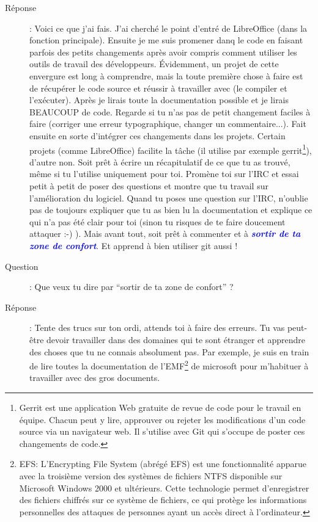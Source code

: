 \documentclass[a4paper,12pt, draft]{report}
\newcommand{\importantPoint}[1]{\textcolor{blue}{\textbf{\textit{#1}}}}
\begin{document}
\begin{description}
\item [Réponse]: Voici ce que j'ai fais. J'ai cherché le point d'entré de LibreOffice (dans la fonction principale). Ensuite je me suis promener danq le code en faisant parfois des petits changements après avoir compris comment utiliser les outils de travail des développeurs. Évidemment, un projet de cette envergure est long à comprendre, mais la toute première chose à faire est de récupérer le code source et réussir à travailler avec (le compiler et l'exécuter). Après je lirais toute la documentation possible et je lirais BEAUCOUP de code.  Regarde si tu n'as pas de petit changement faciles à faire (corriger une erreur typographique, changer un commentaire...). Fait ensuite en sorte d'intégrer ces changements dans les projets. Certain projets (comme LibreOffice) facilite la tâche (il utilise par exemple gerrit\footnote{Gerrit est une application Web gratuite de revue de code pour le travail en équipe. Chacun peut y lire, approuver ou rejeter les modifications d'un code source via un navigateur web. Il s'utilise avec Git qui s'occupe de poster ces changements de code.}), d'autre non. Soit prêt à écrire un récapitulatif de ce que tu as trouvé, même si tu l'utilise uniquement pour toi. Promène toi sur l'IRC et essai petit à petit de poser des questions et montre que tu travail sur l'amélioration du logiciel. Quand tu poses une question sur l'IRC, n'oublie pas de toujours expliquer que tu as bien lu la documentation et explique ce qui n'a pas été clair pour toi  (sinon tu risques de te faire doucement attaquer :-) ). Mais avant tout, soit prêt à commenter et à \importantPoint{sortir de ta zone de confort}. Et apprend à bien utiliser git aussi !
\item [Question]:  Que veux tu dire par ``sortir de ta zone de confort'' ?
\item [Réponse]: Tente des trucs sur ton ordi, attends toi à faire des erreurs. Tu vas peut-être devoir travailler dans des domaines qui te sont étranger et apprendre des choses que tu ne connais absolument pas. Par exemple, je suis en train de lire toutes la documentation de l'EMF\footnote{\textsc{EFS}: L'Encrypting File System (abrégé EFS) est une fonctionnalité apparue avec la troisième version des systèmes de fichiers NTFS disponible sur Microsoft Windows 2000 et ultérieurs. Cette technologie permet d'enregistrer des fichiers chiffrés sur ce système de fichiers, ce qui protège les informations personnelles des attaques de personnes ayant un accès direct à l'ordinateur.} de microsoft pour m'habituer à travailler avec des gros documents.

\end{description}
\end{document}
